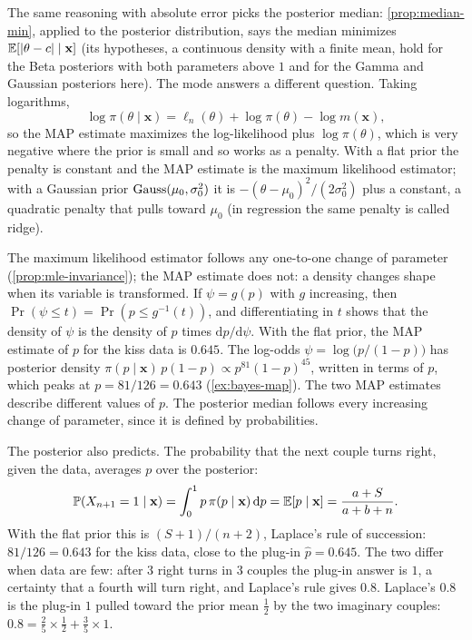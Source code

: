 The same reasoning with absolute error picks the posterior median: \cref{prop:median-min}, applied to the posterior distribution, says the median minimizes $\operatorname*{\mathbb{E}}[\lvert\theta - c\rvert \mid \mathbf{x}]$ (its hypotheses, a continuous density with a finite mean, hold for the Beta posteriors with both parameters above $1$ and for the Gamma and Gaussian posteriors here).
The mode answers a different question.
Taking logarithms,
\[
\log\pi(\theta \mid \mathbf{x}) = \ell_n(\theta) + \log\pi(\theta) - \log m(\mathbf{x}),
\]
so the MAP estimate maximizes the log-likelihood plus $\log\pi(\theta)$, which is very negative where the prior is small and so works as a penalty.
With a flat prior the penalty is constant and the MAP estimate is the maximum likelihood estimator; with a Gaussian prior $\text{Gauss}(\mu_0, \sigma_0^2)$ it is $-(\theta - \mu_0)^2/(2\sigma_0^2)$ plus a constant, a quadratic penalty that pulls toward $\mu_0$ (in regression the same penalty is called ridge).

\begin{pitfall}
The maximum likelihood estimator follows any one-to-one change of parameter (\cref{prop:mle-invariance}); the MAP estimate does not: a density changes shape when its variable is transformed. If $\psi = g(p)$ with $g$ increasing, then $\Pr(\psi \leq t) = \Pr(p \leq g^{-1}(t))$, and differentiating in $t$ shows that the density of $\psi$ is the density of $p$ times $\mathrm{d}p/\mathrm{d}\psi$.
With the flat prior, the MAP estimate of $p$ for the kiss data is $0.645$.
The log-odds $\psi = \log\big(p/(1 - p)\big)$ has posterior density $\pi(p \mid \mathbf{x})\,p(1 - p) \propto p^{81}(1 - p)^{45}$, written in terms of $p$, which peaks at $p = 81/126 = 0.643$ (\cref{ex:bayes-map}).
The two MAP estimates describe different values of $p$.
The posterior median follows every increasing change of parameter, since it is defined by probabilities.
\end{pitfall}

The posterior also predicts.
The probability that the next couple turns right, given the data, averages $p$ over the posterior:
\[
\mathbb{P}(X_{n+1} = 1 \mid \mathbf{x}) = \int_0^1 p\,\pi(p \mid \mathbf{x})\,\mathrm{d}p = \operatorname*{\mathbb{E}}[p \mid \mathbf{x}] = \frac{a + S}{a + b + n}.
\]
With the flat prior this is $(S + 1)/(n + 2)$, Laplace's rule of succession: $81/126 = 0.643$ for the kiss data, close to the plug-in $\hat{p} = 0.645$.
The two differ when data are few: after $3$ right turns in $3$ couples the plug-in answer is $1$, a certainty that a fourth will turn right, and Laplace's rule gives $0.8$.
Laplace's $0.8$ is the plug-in $1$ pulled toward the prior mean $\frac12$ by the two imaginary couples: $0.8 = \frac25 \times \frac12 + \frac35 \times 1$.

